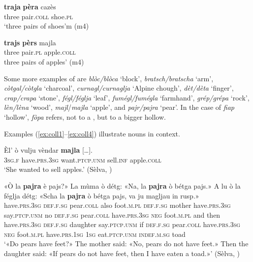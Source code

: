 \ea\label{np1}
\gll    \textbf{traja} \textbf{pèra} cazès \\
three pair.\textsc{coll} shoe.\textsc{pl}\\
\glt `three pairs of shoes'm (m4)
\z

\ea\label{np2}
\gll    \textbf{trajs} \textbf{pèrs} majla\\
three pair.\textsc{pl} apple.\textsc{coll}\\
\glt  three pairs of apples' (m4)
\z

Some more examples of  are
\textit{blòc/blòca} `block',
\textit{bratsch/bratscha} `arm',
\textit{còtgal/còtgla} `charcoal',
\textit{curnagl/curnaglja} `Alpine chough',
\textit{dèt/dèta} `finger',
\textit{crap/crapa} `stone',
\textit{fégl/féglja} `leaf',
\textit{fumégl/fumégla} `farmhand',
\textit{grép/grépa} `rock',
\textit{lèn/lèna} `wood',
\textit{majl}/\textit{majla} `apple', and
\textit{pajr/pajra} `pear'.
In the case of \textit{fiap} `hollow', \textit{fòpa} refers, not to a , but to a bigger hollow.

Examples (\ref{ex:coll1}--\ref{ex:coll4}) illustrate  nouns in context.

\ea\label{ex:coll1}
\gll    Èl’ ò vulju vèndar \textbf{majla} […].\\ 
\textsc{3sg.f} have.\textsc{prs.3sg} want.\textsc{ptcp.unm} sell.\textsc{inf} apple.\textsc{coll}\\
\glt `She wanted to sell apples.' (Sèlva, \citealt[26]{Büchli1966})
\z

\ea\label{ex:ex:coll2}
\gll «Ò la \textbf{pajra} è pajs?» La mùma ò détg: «Na, la \textbf{pajra} ò bétga pajs.» A lu ò la féglja détg: «Scha la \textbf{pajra} ò bétga pajs, va ju magljau in rusp.»\\
have.\textsc{prs.3sg} \textsc{def.f.sg} pear.\textsc{coll} also foot.\textsc{m.pl} \textsc{def.f.sg} mother have.\textsc{prs.3sg} say.\textsc{ptcp.unm} no \textsc{def.f.sg}  pear.\textsc{coll} have.\textsc{prs.3sg} \textsc{neg} foot.\textsc{m.pl} and then have.\textsc{prs.3sg} \textsc{def.f.sg} daughter say.\textsc{ptcp.unm} if \textsc{def.f.sg} pear.\textsc{coll} have.\textsc{prs.3sg} \textsc{neg} foot.\textsc{m.pl} have.\textsc{prs.1sg} \textsc{1sg} eat.\textsc{ptcp.unm} \textsc{indef.m.sg} toad\\
\glt `«Do pears have feet?» The mother said: «No, pears do not have feet.» Then the daughter said: «If pears do not have feet, then I have eaten a toad.»' (Sèlva, \citealt[53]{Büchli1966})
\z

